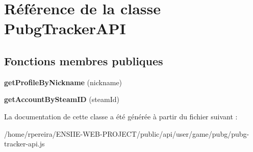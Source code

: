 \hypertarget{classPubgTrackerAPI}{}\section{Référence de la classe Pubg\+Tracker\+A\+PI}
\label{classPubgTrackerAPI}
\subsection*{Fonctions membres publiques}
\begin{DoxyCompactItemize}
\item 
{\bfseries get\+Profile\+By\+Nickname} (nickname)\hypertarget{classPubgTrackerAPI_af8005cdd1e105b62a82401961f20b843}{}\label{classPubgTrackerAPI_af8005cdd1e105b62a82401961f20b843}

\item 
{\bfseries get\+Account\+By\+Steam\+ID} (steam\+Id)\hypertarget{classPubgTrackerAPI_a8518ac8e9a3be843bb23a9240e412e25}{}\label{classPubgTrackerAPI_a8518ac8e9a3be843bb23a9240e412e25}

\end{DoxyCompactItemize}


La documentation de cette classe a été générée à partir du fichier suivant \+:\begin{DoxyCompactItemize}
\item 
/home/rpereira/\+E\+N\+S\+I\+I\+E-\/\+W\+E\+B-\/\+P\+R\+O\+J\+E\+C\+T/public/api/user/game/pubg/pubg-\/tracker-\/api.\+js\end{DoxyCompactItemize}
